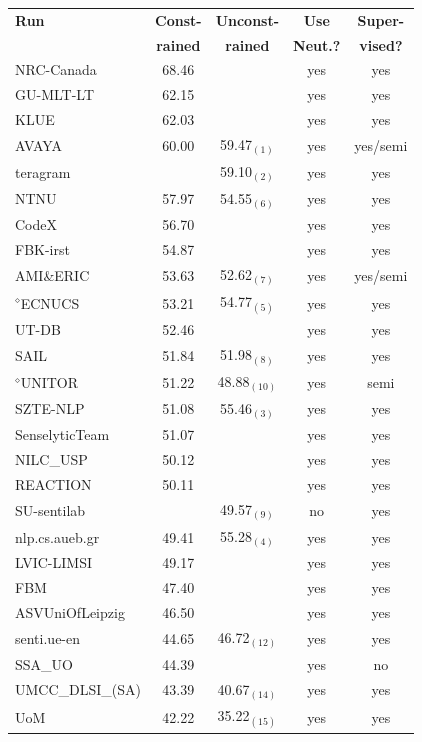 \begin{table}[t!]
    \centering
    \begin{small}
    \begin{tabular}{l@{ }c@{ }c@{ }c@{ }c}
    \bf Run & \bf Const- & \bf Unconst- & \bf Use & \bf Super-\\
    & \bf rained & \bf rained & \bf Neut.? & \bf vised?\\
    \hline
    NRC-Canada & 68.46 &  & yes & yes\\
    GU-MLT-LT & 62.15 &  & yes & yes\\
    KLUE & 62.03 &  & yes & yes\\
    AVAYA & 60.00 & 59.47$_{(1)}$ & yes & yes/semi\\
    teragram &  & 59.10$_{(2)}$ & yes & yes\\
    NTNU & 57.97 & 54.55$_{(6)}$ & yes & yes\\
    CodeX & 56.70 &  & yes & yes\\
    FBK-irst & 54.87 &  & yes & yes\\
    AMI\&ERIC & 53.63 & 52.62$_{(7)}$ & yes & yes/semi\\
    $^\diamond$ECNUCS & 53.21 & 54.77$_{(5)}$ & yes & yes\\
    UT-DB & 52.46 &  & yes & yes\\
    SAIL & 51.84 & 51.98$_{(8)}$ & yes & yes\\
    $^\diamond$UNITOR & 51.22 & 48.88$_{(10)}$ & yes & semi\\
    SZTE-NLP & 51.08 & 55.46$_{(3)}$ & yes & yes\\
    SenselyticTeam & 51.07 &  & yes & yes\\
    NILC\_USP & 50.12 &  & yes & yes\\
    REACTION & 50.11 &  & yes & yes\\
    SU-sentilab &  & 49.57$_{(9)}$ & no & yes\\
    nlp.cs.aueb.gr & 49.41 & 55.28$_{(4)}$ & yes & yes\\
    LVIC-LIMSI & 49.17 &  & yes & yes\\
    FBM & 47.40 &  & yes & yes\\
    ASVUniOfLeipzig & 46.50 &  & yes & yes\\
    senti.ue-en & 44.65 & 46.72$_{(12)}$ & yes & yes\\
    SSA\_UO & 44.39 &  & yes & no\\
    UMCC\_DLSI\_(SA) & 43.39 & 40.67$_{(14)}$ & yes & yes\\
    UoM & 42.22 & 35.22$_{(15)}$ & yes & yes\\

\end{tabular}
\end{small}
\end{table}
